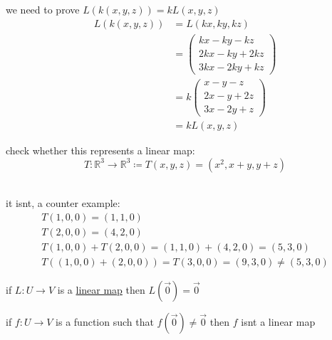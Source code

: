 \documentclass[a4paper,12pt]{article}
\begin{document}
\begin{definition}
\begin{question}
\begin{answer}
\begin{step}
\end{step}
\begin{step}
we need to prove \(L(k(x,y,z)) = kL(x,y,z)\)\\
\begin{align*}
  L(k(x,y,z)) &= L(kx,ky,kz)\\
  &= \begin{pmatrix}
       kx-ky-kz\\
       2kx-ky+2kz\\
       3kx-2ky+kz
     \end{pmatrix}\\
  &= k\begin{pmatrix}
        x-y-z\\
        2x-y+2z\\
        3x-2y+z
      \end{pmatrix}\\
  &= kL(x,y,z)
\end{align*}
\end{step}
\end{answer}
\end{question}

\begin{question}
check whether this represents a linear map:\\
\[
  T: \mathbb{R}^3 \to \mathbb{R}^3 \coloneqq T(x,y,z) = (x^2,x+y,y+z)
\]\\
\begin{answer}
it isnt, a counter example:\\
\begin{gather*}
  T(1,0,0) = (1,1,0)\\
  T(2,0,0) = (4,2,0)\\
  T(1,0,0) + T(2,0,0) = (1,1,0) + (4,2,0) = (5, 3, 0)\\
  T((1,0,0) + (2,0,0)) = T(3,0,0) = (9,3,0) \neq (5,3,0)
\end{gather*}
\end{answer}
\end{question}

\begin{lemma}
if \(L: U \to V\) is a \hyperref[sec:orgdf3d063]{linear map} then \(L(\vec0)=\vec0\)\\
\begin{entailment}
if \(f: U \to V\) is a function such that \(f(\vec0)\neq\vec0\) then \(f\) isnt a linear map\\
\end{entailment}
\end{lemma}


\end{definition}
\end{document}
